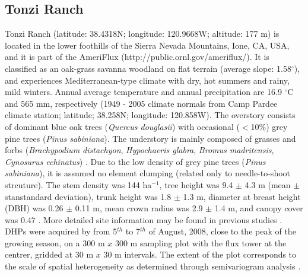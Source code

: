 \documentclass[a4paper,11pt]{report}
\begin{document}
\subsection{Tonzi Ranch}

Tonzi Ranch (latitude: 38.4318N; longitude: 120.9668W; altitude: 177 m) is located in the lower foothills of the Sierra Nevada Mountains, Ione, CA, USA, and it is part of
the AmeriFlux (http://public.ornl.gov/ameriflux/). It is classified as an oak-grass savanna woodland on flat terrain (average slope: 1.58$^{\circ}$), and experiences Mediterranean-type climate with dry, hot summers and rainy, mild winters. Annual average temperature and annual precipitation are 16.9 $^{\circ}$C and 565 mm, respectively (1949 - 2005 climate normals from Camp Pardee climate station; latitude; 38.258N; longitude: 120.858W). The overstory consists of dominant blue oak trees (\textit{Quercus douglasii}) with occasional ($<$10\%) grey pine trees (\textit{Pinus sabiniana}). The understory is mainly composed of grasses and forbs (\textit{Brachypodium distachyon}, \textit{Hypochaeris glabra}, \textit{Bromus madritensis}, \textit{Cynosurus echinatus}) \citep{Baldocchi2004}. Due to the low density of grey pine trees (\textit{Pinus sabiniana}), it is assumed no element clumping (related only to needle-to-shoot strcuture). The stem density was 144 ha$^{-1}$, tree height was 9.4 $\pm$ 4.3 m (mean $\pm$ stanstandard deviation), trunk height was 1.8 $\pm$ 1.3 m, diameter at breast height (DBH) was 0.26 $\pm$ 0.11 m, mean crown radius was 2.9 $\pm$ 1.4 m, and canopy cover was 0.47 \citep{Chen2008}. More detailed site information may be found in previous studies \citep{Baldocchi2004,Ma2007,Chen2008}. DHPs were acquired by \citet{Ryu2010} from 5$^{th}$ to 7$^{th}$ of August, 2008, close to the peak of the growing season, on a 300 m $x$ 300 m sampling plot with the flux tower at the centrer, gridded at 30 m $x$ 30 m intervals. The extent of the plot corresponds to the scale of spatial heterogeneity as determined through semivariogram analysis \citep{Kim2006}. 
\end{document}
